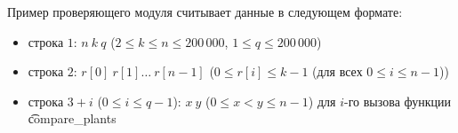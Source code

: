 Пример проверяющего модуля считывает данные в следующем формате:
\begin{itemize}
\item строка $1$: $n\ k\ q$ ($2 \leq k \leq n  \leq 200\,000$, $1 \leq q \leq 200\,000$)
\item строка $2$: $r[0]\ r[1]\ldots\ r[n-1]$ ($0 \leq r[i] \leq k - 1$ (для всех $0 \leq i \leq n - 1$))
\item строка $3 + i$ ($0 \leq i \leq q - 1$): $x\ y$ ($0 \leq x < y \leq n - 1$) для $i$-го вызова функции \t{compare\_plants}
\end{itemize}